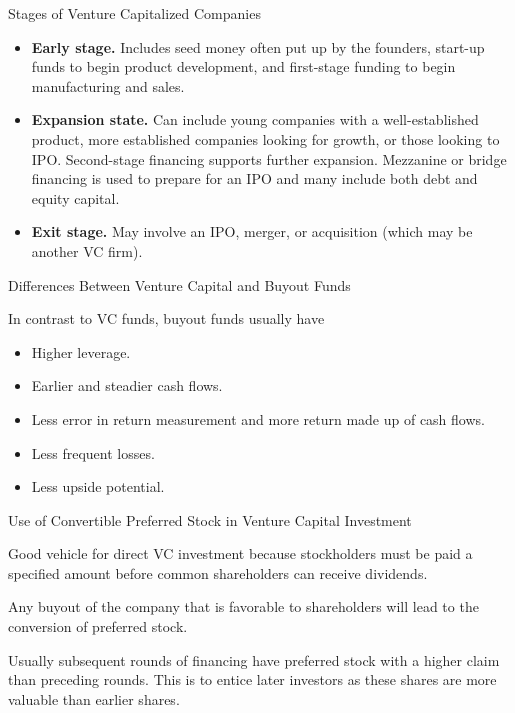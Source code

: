 \documentclass[../custom]{flashcards}
\begin{document}
\begin{flashcard}{Stages of Venture Capitalized Companies}
    \begin{itemize}
        \item \textbf{Early stage.} Includes seed money often put up by the founders, start-up funds to begin product development, and first-stage funding to begin manufacturing and sales.
        \item \textbf{Expansion state.} Can include young companies with a well-established product, more established companies looking for growth, or those looking to IPO. Second-stage financing supports further expansion. Mezzanine or bridge financing is used to prepare for an IPO and many include both debt and equity capital.
        \item \textbf{Exit stage.} May involve an IPO, merger, or acquisition (which may be another VC firm).
    \end{itemize}
\end{flashcard}

\begin{flashcard}{Differences Between Venture Capital and Buyout Funds}
    \begin{flushleft}
        In contrast to VC funds, buyout funds usually have
        \begin{itemize}
            \item Higher leverage.
            \item Earlier and steadier cash flows.
            \item Less error in return measurement and more return made up of cash flows.
            \item Less frequent losses.
            \item Less upside potential.
        \end{itemize}
    \end{flushleft}
\end{flashcard}

\begin{flashcard}{Use of Convertible Preferred Stock in Venture Capital Investment}
    \begin{flushleft}
        Good vehicle for direct VC investment because stockholders must be paid a specified amount before common shareholders can receive dividends.\newline

        Any buyout of the company that is favorable to shareholders will lead to the conversion of preferred stock.\newline

        Usually subsequent rounds of financing have preferred stock with a higher claim than preceding rounds. This is to entice later investors as these shares are more valuable than earlier shares. 
    \end{flushleft}
\end{flashcard}
\end{document}
